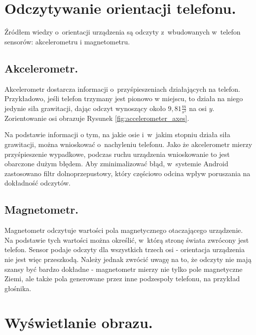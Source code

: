 \documentclass[a4paper,twocolumn,11pt]{article}
\begin{document}

\section{Odczytywanie orientacji telefonu.} \label{sec:orientation_tracking}

Źródłem wiedzy o~orientacji urządzenia są odczyty z~wbudowanych w~telefon sensorów: akcelerometru i magnetometru.


\subsection{Akcelerometr.}
 Akcelerometr dostarcza informacji o~przyśpieszeniach działających na telefon.
 Przykładowo, jeśli telefon trzymany jest pionowo w miejscu, to działa na niego jedynie siła grawitacji, dając odczyt wynoszący około $9,81\frac{m}{s^2}$ na osi $y$.
 Zorientowanie osi obrazuje Rysunek \ref{fig:accelerometer_axes}.
 
 

 Na podstawie informacji o tym, na jakie osie i~w~jakim stopniu działa siła grawitacji, można wnioskować o~nachyleniu telefonu.
 Jako że akcelerometr mierzy przyśpieszenie wypadkowe, podczas ruchu urządzenia wnioskowanie to jest obarczone dużym błędem.
 Aby zminimalizować błąd, w~systemie Android zastosowano filtr dolnoprzepustowy, który częściowo odcina wpływ poruszania na dokładność odczytów.


\subsection{Magnetometr.}
 Magnetometr odczytuje wartości pola magnetycznego otaczającego urządzenie.
 Na podstawie tych wartości można określić, w~którą stronę świata zwrócony jest telefon.
 Sensor podaje odczyty dla wszystkich trzech osi - orientacja urządzenia nie jest więc przeszkodą.
 Należy jednak zwrócić uwagę na to, że odczyty nie mają szansy być bardzo dokładne - magnetometr mierzy nie tylko pole magnetyczne Ziemi, ale także pola generowane przez inne podzespoły telefonu, na przykład głośnika.\\

 




\section{Wyświetlanie obrazu.} \label{sec:image_rendering}
\end{document}
